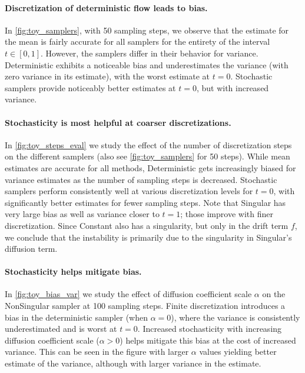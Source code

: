 \paragraph{Discretization of deterministic flow leads to bias.}
In \cref{fig:toy_samplers}, with 50 sampling steps, we observe that the estimate for the mean is fairly accurate for all samplers for the entirety of the interval $t \in [0, 1]$.
However, the samplers differ in their behavior for variance.
Deterministic exhibits a noticeable bias and underestimates the variance (with zero variance in its estimate), with the worst estimate at $t=0$.
Stochastic samplers provide noticeably better estimates at $t=0$, but with increased variance.

\paragraph{Stochasticity is most helpful at coarser discretizations.}
In \cref{fig:toy_steps_eval} we study the effect of the number of discretization steps on the different samplers (also see \cref{fig:toy_samplers} for 50 steps).
While mean estimates are accurate for all methods, Deterministic gets increasingly biased for variance estimates as the number of sampling steps is decreased.
Stochastic samplers perform consistently well at various discretization levels for $t=0$, with significantly better estimates for fewer sampling steps.
Note that Singular has very large bias as well as variance closer to $t=1$; those improve with finer discretization.
Since Constant also has a singularity, but only in the drift term $f$, we conclude that the instability is primarily due to the singularity in Singular's diffusion term.

\paragraph{Stochasticity helps mitigate bias.}
In \cref{fig:toy_bias_var} we study the effect of diffusion coefficient scale $\alpha$ on the NonSingular sampler at 100 sampling steps.
Finite discretization introduces a bias in the deterministic sampler (when $\alpha=0$), where the variance is consistently underestimated and is worst at $t=0$.
Increased stochasticity with increasing diffusion coefficient scale ($\alpha>0$) helps mitigate this bias at the cost of increased variance.
This can be seen in the figure with larger $\alpha$ values yielding better estimate of the variance, although with larger variance in the estimate.



